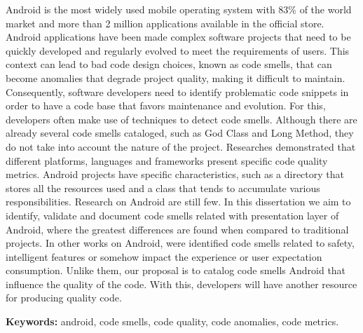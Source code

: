 Android is the most widely used mobile operating system with 83\% of the world market and more than 2 million applications available in the official store. Android applications have been made complex software projects that need to be quickly developed and regularly evolved to meet the requirements of users. This context can lead to bad code design choices, known as code smells, that can become anomalies that degrade project quality, making it difficult to maintain. Consequently, software developers need to identify problematic code snippets in order to have a code base that favors maintenance and evolution. For this, developers often make use of techniques to detect code smells. Although there are already several code smells cataloged, such as God Class and Long Method, they do not take into account the nature of the project. Researches demonstrated that different platforms, languages and frameworks present specific code quality metrics. Android projects have specific characteristics, such as a directory that stores all the resources used and a class that tends to accumulate various responsibilities. Research on Android are still few. In this dissertation we aim to identify, validate and document code smells related with presentation layer of Android, where the greatest differences are found when compared to traditional projects. In other works on Android, were identified code smells related to safety, intelligent features or somehow impact the experience or user expectation consumption. Unlike them, our proposal is to catalog code smells Android that influence the quality of the code. With this, developers will have another resource for producing quality code.

\noindent \textbf{Keywords:} android, code smells, code quality, code anomalies, code metrics.